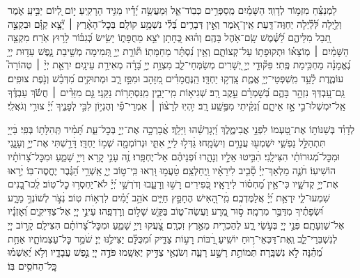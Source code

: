 \begin{narrow}
	לַמְנַצֵּ֗חַ מִזְמ֥וֹר לְדָוִֽד׃
	הַשָּׁמַ֗יִם מְֽסַפְּרִ֥ים כְּבֽוֹד־אֵ֑ל וּֽמַעֲשֵׂ֥ה יָ֝דָ֗יו מַגִּ֥יד הָרָקִֽיעַ׃
	י֣וֹם לְ֭יוֹם יַבִּ֣יעַֽ אֹ֑מֶר וְלַ֥יְלָה לְּ֝לַ֗יְלָה יְחַוֶּה־דָּֽעַת׃
	אֵֽין־אֹ֭מֶר וְאֵ֣ין דְּבָרִ֑ים בְּ֝לִ֗י נִשְׁמָ֥ע קוֹלָֽם׃
	בְּכׇל־הָאָ֨רֶץ ׀ יָ֘צָ֤א קַוָּ֗ם וּבִקְצֵ֣ה תֵ֭בֵל מִלֵּיהֶ֑ם לַ֝שֶּׁ֗מֶשׁ שָֽׂם־אֹ֥הֶל בָּהֶֽם׃
	וְה֗וּא כְּ֭חָתָן יֹצֵ֣א מֵחֻפָּת֑וֹ יָשִׂ֥ישׂ כְּ֝גִבּ֗וֹר לָר֥וּץ אֹֽרַח׃
	מִקְצֵ֤ה הַשָּׁמַ֨יִם ׀ מֽוֹצָא֗וֹ וּתְקוּפָת֥וֹ עַל־קְצוֹתָ֑ם וְאֵ֥ין נִ֝סְתָּ֗ר מֵחַמָּתֽוֹ׃
	תּ֘וֹרַ֤ת יְיָ֣ תְּ֭מִימָה מְשִׁ֣יבַת נָ֑פֶשׁ עֵד֥וּת יְיָ֥ נֶ֝אֱמָנָ֗ה מַחְכִּ֥ימַת פֶּֽתִי׃
	פִּקּ֘וּדֵ֤י יְיָ֣ יְ֭שָׁרִים מְשַׂמְּחֵי־לֵ֑ב מִצְוַ֥ת יְיָ֥ בָּ֝רָ֗ה מְאִירַ֥ת עֵינָֽיִם׃
	יִרְאַ֤ת יְיָ֨ ׀ טְהוֹרָה֮ עוֹמֶ֢דֶת לָ֫עַ֥ד מִֽשְׁפְּטֵי־יְיָ֥ אֱמֶ֑ת צָֽדְק֥וּ יַחְדָּֽו׃
	הַֽנֶּחֱמָדִ֗ים מִ֭זָּהָב וּמִפַּ֣ז רָ֑ב וּמְתוּקִ֥ים מִ֝דְּבַ֗שׁ וְנֹ֣פֶת צוּפִֽים׃
	גַּֽם־עַ֭בְדְּךָ נִזְהָ֣ר בָּהֶ֑ם בְּ֝שׇׁמְרָ֗ם עֵ֣קֶב רָֽב׃
	שְׁגִיא֥וֹת מִֽי־יָבִ֑ין מִֽנִּסְתָּר֥וֹת נַקֵּֽנִי׃
	גַּ֤ם מִזֵּדִ֨ים ׀ חֲשֹׂ֬ךְ עַבְדֶּ֗ךָ אַֽל־יִמְשְׁלוּ־בִ֣י אָ֣ז אֵיתָ֑ם וְ֝נִקֵּ֗יתִי מִפֶּ֥שַֽׁע רָֽב׃
	יִ֥הְיֽוּ לְרָצ֨וֹן ׀ אִמְרֵי־פִ֡י וְהֶגְי֣וֹן לִבִּ֣י לְפָנֶ֑יךָ יְ֝יָ֗ צוּרִ֥י וְגֹאֲלִֽי׃
	
	
	\enlargethispage{\baselineskip}
	
	לְדָוִ֗ד
	בְּשַׁנּוֹת֣וֹ אֶת־טַ֭עְמוֹ לִפְנֵ֣י אֲבִימֶ֑לֶךְ וַ֝יְגָרְשֵׁ֗הוּ וַיֵּלַֽךְ׃
	אֲׄבָרְכָ֣ה אֶת־יְיָ֣ בְּכׇל־עֵ֑ת תָּ֝מִ֗יד תְּֽהִלָּת֥וֹ בְּפִֽי׃
	בַּׄייָ֭ תִּתְהַלֵּ֣ל נַפְשִׁ֑י יִשְׁמְע֖וּ עֲנָוִ֣ים וְיִשְׂמָֽחוּ׃
	גַּׄדְּל֣וּ לַייָ֣ אִתִּ֑י וּנְרוֹמְמָ֖ה שְׁמ֣וֹ יַחְדָּֽו׃
	דָּׄרַ֣שְׁתִּי אֶת־יְיָ֣ וְעָנָ֑נִי וּמִכׇּל־מְ֝גוּרוֹתַ֗י הִצִּילָֽנִי׃
	הִׄבִּ֣יטוּ אֵלָ֣יו וְנָהָ֑רוּ וּ֝פְנֵיהֶ֗ם אַל־יֶחְפָּֽרוּ׃
	זֶ֤ׄה עָנִ֣י קָ֭רָא וַייָ֣ שָׁמֵ֑עַ וּמִכׇּל־צָ֝רוֹתָ֗יו הוֹשִׁיעֽוֹ׃
	חֹׄנֶ֤ה מַלְאַךְ־יְיָ֓ סָ֘בִ֤יב לִירֵאָ֗יו וַֽיְחַלְּצֵֽם׃
	טַׄעֲמ֣וּ וּ֭רְאוּ כִּֽי־ט֣וֹב יְיָ֑ אַֽשְׁרֵ֥י הַ֝גֶּ֗בֶר יֶחֱסֶה־בּֽוֹ׃
	יְׄר֣אוּ אֶת־יְיָ֣ קְדֹשָׁ֑יו כִּי־אֵ֥ין מַ֝חְס֗וֹר לִירֵאָֽיו׃
	כְּ֭ׄפִירִים רָשׁ֣וּ וְרָעֵ֑בוּ וְדֹרְשֵׁ֥י יְ֝יָ֗ לֹא־יַחְסְר֥וּ כׇל־טֽוֹב׃
	לְֽׄכוּ־בָ֭נִים שִׁמְעוּ־לִ֑י יִֽרְאַ֥ת יְ֝יָ֗ אֲלַמֶּדְכֶֽם׃
	מִֽׄי־הָ֭אִישׁ הֶחָפֵ֣ץ חַיִּ֑ים אֹהֵ֥ב יָ֝מִ֗ים לִרְא֥וֹת טֽוֹב׃
	נְׄצֹ֣ר לְשׁוֹנְךָ֣ מֵרָ֑ע וּ֝שְׂפָתֶ֗יךָ מִדַּבֵּ֥ר מִרְמָֽה׃
	ס֣ׄוּר מֵ֭רָע וַעֲשֵׂה־ט֑וֹב בַּקֵּ֖שׁ שָׁל֣וֹם וְרׇדְפֵֽהוּ׃
	עֵׄינֵ֣י יְיָ֭ אֶל־צַדִּיקִ֑ים וְ֝אׇזְנָ֗יו אֶל־שַׁוְעָתָֽם׃
	פְּׄנֵ֣י יְיָ֭ בְּעֹ֣שֵׂי רָ֑ע לְהַכְרִ֖ית מֵאֶ֣רֶץ זִכְרָֽם׃
	צָ֭ׄעֲקוּ וַייָ֣ שָׁמֵ֑עַ וּמִכׇּל־צָ֝רוֹתָ֗ם הִצִּילָֽם׃
	קָׄר֣וֹב יְיָ֭ לְנִשְׁבְּרֵי־לֵ֑ב וְֽאֶת־דַּכְּאֵי־ר֥וּחַ יוֹשִֽׁיעַ׃
	רַ֭ׄבּוֹת רָע֣וֹת צַדִּ֑יק וּ֝מִכֻּלָּ֗ם יַצִּילֶ֥נּוּ יְיָ׃
	שֹׁׄמֵ֥ר כׇּל־עַצְמוֹתָ֑יו אַחַ֥ת מֵ֝הֵ֗נָּה לֹ֣א נִשְׁבָּֽרָה׃
	תְּׄמוֹתֵ֣ת רָשָׁ֣ע רָעָ֑ה וְשֹׂנְאֵ֖י צַדִּ֣יק יֶאְשָֽׁמוּ׃
	פֹּדֶ֣ה יְיָ֭ נֶ֣פֶשׁ עֲבָדָ֑יו וְלֹ֥א יֶ֝אְשְׁמ֗וּ כׇּֽל־הַחֹסִ֥ים בּֽוֹ׃
	

\end{narrow}
